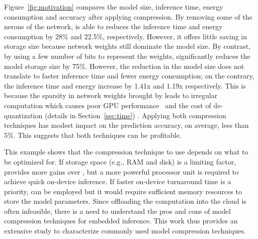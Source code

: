  Figure~\ref{fig:motivation} compares the model size, inference time, energy consumption and accuracy after
applying compression. By removing some of the nerons of the network, \pruning is able to reduces the inference time and energy consumption
by 28\% and 22.5\%, respectively. However, it offers little saving in storage size because network weights still dominate the model size.
By contrast, by using a few number of bits to represent the weights, \quantization significantly reduces the model storage size by 75\%.
However, the reduction in the model size does not translate to faster inference time and fewer energy consumption; on the contrary, the
inference time and energy increase by 1.41x and 1.19x respectively. This is because the sparsity in network weights brought by
\quantization leads to irregular computation which causes poor GPU performance~\cite{DBLP:journals/corr/abs-1802-10280} and the cost of
de-quantization (details in Section~\ref{sec:time}) . Applying both compression techniques has modest impact on the prediction accuracy, on
average, less than 5\%. This suggests that both techniques can be profitable.

 This example shows that the compression technique to use depends on what to be optimized for. If storage
space (e.g., RAM and disk) is a limiting factor, \quantization provides more gains over \pruning, but a more powerful processor unit is
required to achieve quick on-device inference. If faster on-device turnaround time is a priority, \pruning can be employed but it would
require sufficient memory resources to store the model parameters.  Since offloading the computation into the cloud is often infeasible,
there is a need to understand the pros and cons of model compression techniques for embedded inference. This work thus provides an
extensive study to characterize commonly used model compression techniques.
